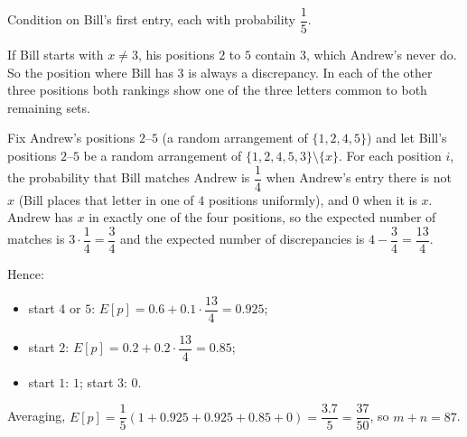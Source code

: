 Condition on Bill's first entry, each with probability $\dfrac15$.

If Bill starts with $x\ne3$, his positions $2$ to $5$ contain $3$, which Andrew's never do. So the position where Bill has $3$ is always a discrepancy. In each of the other three positions both rankings show one of the three letters common to both remaining sets.

Fix Andrew's positions $2$--$5$ (a random arrangement of $\{1,2,4,5\}$) and let Bill's positions $2$--$5$ be a random arrangement of $\{1,2,4,5,3\}\setminus\{x\}$. For each position $i$, the probability that Bill matches Andrew is $\dfrac14$ when Andrew's entry there is not $x$ (Bill places that letter in one of $4$ positions uniformly), and $0$ when it is $x$. Andrew has $x$ in exactly one of the four positions, so the expected number of matches is $3\cdot\dfrac14=\dfrac34$ and the expected number of discrepancies is $4-\dfrac34=\dfrac{13}4$.

Hence:
\begin{itemize}
\item start $4$ or $5$: $E[p]=0.6+0.1\cdot\dfrac{13}4=0.925$;
\item start $2$: $E[p]=0.2+0.2\cdot\dfrac{13}4=0.85$;
\item start $1$: $1$; start $3$: $0$.
\end{itemize}
Averaging, $E[p]=\dfrac15(1+0.925+0.925+0.85+0)=\dfrac{3.7}{5}=\dfrac{37}{50}$, so $m+n=\boxed{87}$.
